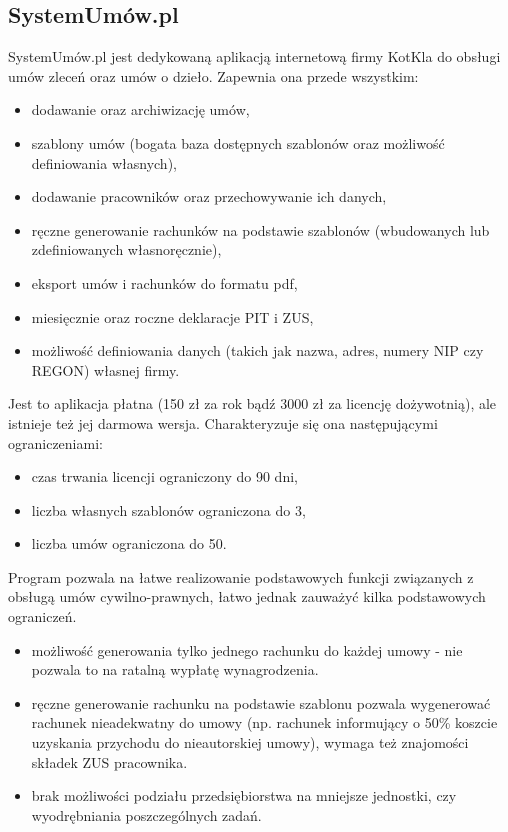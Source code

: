 \subsection[SystemUmów.pl][SystemUmów.pl]{SystemUmów.pl}
SystemUmów.pl jest dedykowaną aplikacją internetową firmy KotKla do obsługi umów zleceń oraz umów o dzieło. Zapewnia ona przede wszystkim:
\begin{itemize}
	\item dodawanie oraz archiwizację umów,
	\item szablony umów (bogata baza dostępnych szablonów oraz możliwość definiowania własnych),
	\item dodawanie pracowników oraz przechowywanie ich danych,
	\item ręczne generowanie rachunków na podstawie szablonów (wbudowanych lub zdefiniowanych własnoręcznie),
	\item eksport umów i rachunków do formatu pdf,
	\item miesięcznie oraz roczne deklaracje PIT i ZUS,
	\item możliwość definiowania danych (takich jak nazwa, adres, numery NIP czy REGON) własnej firmy.
\end{itemize}

Jest to aplikacja płatna (150 zł za rok bądź 3000 zł za licencję dożywotnią), ale istnieje też jej darmowa wersja. Charakteryzuje się ona następującymi ograniczeniami:
\begin{itemize}
	\item czas trwania licencji ograniczony do 90 dni,
	\item liczba własnych szablonów ograniczona do 3,
	\item liczba umów ograniczona do 50.
\end{itemize}
Program pozwala na łatwe realizowanie podstawowych funkcji związanych z obsługą umów cywilno-prawnych, łatwo jednak zauważyć kilka podstawowych ograniczeń.
\begin{itemize}
	\item możliwość generowania tylko jednego rachunku do każdej umowy - nie pozwala to na ratalną wypłatę wynagrodzenia.
	\item ręczne generowanie rachunku na podstawie szablonu pozwala wygenerować rachunek nieadekwatny do umowy (np. rachunek informujący o 50\% koszcie uzyskania przychodu do nieautorskiej umowy), wymaga też znajomości składek ZUS pracownika.
	\item brak możliwości podziału przedsiębiorstwa na mniejsze jednostki, czy wyodrębniania poszczególnych zadań.
\end{itemize}

